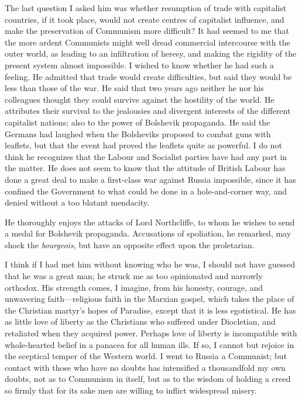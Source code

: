 The last question I asked him was whether resumption of trade with capitalist countries, if it took place, would not create centres of capitalist influence, and make the preservation of Communism more difficult? It had seemed to me that the more ardent Communists might well dread commercial intercourse with the outer world, as leading to an infiltration of heresy, and making the rigidity of the present system almost impossible. I wished to know whether he had such a feeling. He admitted that trade would create difficulties, but said they would be less than those of the war. He said that two years ago neither he nor his colleagues thought they could survive against the hostility of the world. He attributes their survival to the jealousies and divergent interests of the different capitalist nations; also to the power of Bolshevik propaganda. He said the Germans had laughed when the Bolsheviks proposed to combat guns with leaflets, but that the event had proved the leaflets quite as powerful. I do not think he recognizes that the Labour and Socialist parties have had any part in the matter. He does not seem to know that the attitude of British Labour has done a great deal to make a first-class war against Russia impossible, since it has confined the Government to what could be done in a hole-and-corner way, and denied without a too blatant mendacity.

He thoroughly enjoys the attacks of Lord Northcliffe, to whom he wishes to send a medal for Bolshevik propaganda. Accusations of spoliation, he remarked, may shock the \emph{bourgeois}, but have an opposite effect upon the proletarian.

I think if I had met him without knowing who he was, I should not have guessed that he was a great man; he struck me as too opinionated and narrowly orthodox. His strength comes, I imagine, from his honesty, courage, and unwavering faith---religious faith in the Marxian gospel, which takes the place of the Christian martyr's hopes of Paradise, except that it is less egotistical. He has as little love of liberty as the Christians who suffered under Diocletian, and retaliated when they acquired power. Perhaps love of liberty is incompatible with whole-hearted belief in a panacea for all human ills. If so, I cannot but rejoice in the sceptical temper of the Western world. I went to Russia a Communist; but contact with those who have no doubts has intensified a thousandfold my own doubts, not as to Communism in itself, but as to the wisdom of holding a creed so firmly that for its sake men are willing to inflict widespread misery.

